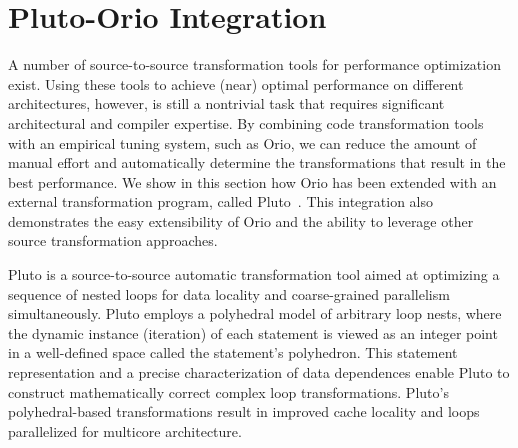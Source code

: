 \section{Pluto-Orio Integration}
\label{sec:integration}

A number of source-to-source transformation tools for performance
optimization exist. Using these tools to achieve (near) optimal performance
on different architectures, however, is still a nontrivial task that requires
significant architectural and compiler expertise. By combining code
transformation tools with an empirical tuning system, such as Orio, we can
reduce the amount of manual effort and automatically determine the
transformations that result in the best performance. We show in this section
how Orio has been extended with an external transformation program, called
Pluto~\cite{uday08pldi}. This integration also demonstrates the easy
extensibility of Orio and the ability to leverage other source transformation
approaches.

Pluto is a source-to-source automatic transformation tool aimed at optimizing
a sequence of nested loops for data locality and coarse-grained parallelism
simultaneously. Pluto employs a polyhedral model of arbitrary loop nests,
where the dynamic instance (iteration) of each statement is viewed as an
integer point in a well-defined space called the statement's polyhedron. This
statement representation and a precise characterization of data dependences
enable Pluto to construct mathematically correct complex loop
transformations. Pluto's polyhedral-based transformations result in improved
cache locality and loops parallelized for multicore architecture.

